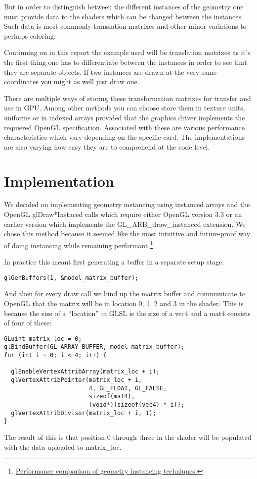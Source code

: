 \documentclass[a4paper,12pt]{article}
\begin{document}
But in order to distinguish between the different instances of the geometry one must provide data to the shaders which can be changed between the instances. Such data is most commonly translation matrixes and other minor variations to perhaps coloring.

Continuing on in this report the example used will be translation matrixes as it's the first thing one has to differentiate between the instances in order to see that they are separate objects. If two instances are drawn at the very same coordinates you might as well just draw one.

There are multiple ways of storing these transformation matrixes for transfer and use in GPU. Among other methods you can choose store them in texture units, uniforms or in indexed arrays provided that the graphics driver implements the requiered OpenGL specification. Associated with these are various performance characteristics which vary depending on the specific card. The implementations are also varying how easy they are to comprehend at the code level.


\section{Implementation}

We decided on implementing geometry instancing using instanced arrays and the OpenGL glDraw*Instaced calls which require either OpenGL version 3.3 or an earlier version which implements the GL\_ARB\_draw\_instanced extension. We chose this method because it seemed like the most intuitive and future-proof way of doing instancing while remaining performant \footnote{\href{http://sol.gfxile.net/instancing.html}{Performance comparison of geometry instancing techniques.}}.

In practice this meant first generating a buffer in a separate setup stage:

\begin{lstlisting}
glGenBuffers(1, &model_matrix_buffer);
\end{lstlisting}
\noindent
And then for every draw call we bind up the matrix buffer and communicate to OpenGL that the matrix will be in location 0, 1, 2 and 3 in the shader. This is because the size of a ``location'' in GLSL is the size of a vec4 and a mat4 consists of four of these:
\begin{lstlisting}
GLuint matrix_loc = 0;
glBindBuffer(GL_ARRAY_BUFFER, model_matrix_buffer);
for (int i = 0; i < 4; i++) {

  glEnableVertexAttribArray(matrix_loc + i);
  glVertexAttribPointer(matrix_loc + i,
                        4, GL_FLOAT, GL_FALSE,
                        sizeof(mat4),
                        (void*)(sizeof(vec4) * i));
  glVertexAttribDivisor(matrix_loc + i, 1);
}
\end{lstlisting}
\noindent
The result of this is that position 0 through three in the shader will be populated with the data uploaded to matrix\_loc.
\end{document}
